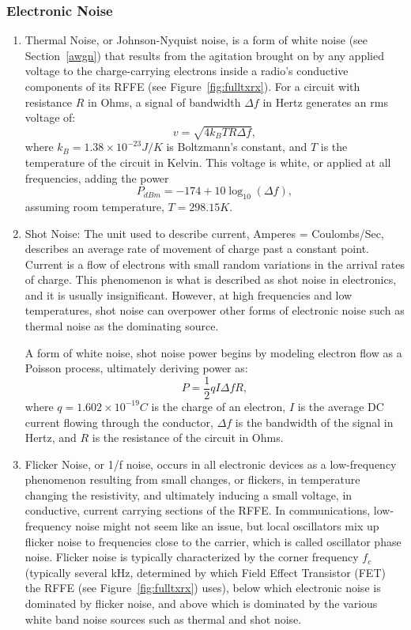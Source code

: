 \subsubsection{Electronic Noise}
\label{enoise}
\begin{enumerate}
	\item Thermal Noise, or Johnson-Nyquist noise, is a form of white noise (see Section~\ref{awgn}) that results from the agitation brought on by any applied voltage to the charge-carrying electrons inside a radio's conductive components of its RFFE (see Figure~\ref{fig:fulltxrx}). For a circuit with resistance $R$ in Ohms, a signal of bandwidth $\Delta f$ in Hertz generates an rms voltage of:
\begin{equation}
\label{eq;thermnoise}
v = \sqrt{4 k_B T R \Delta f},
\end{equation}
where $k_B=1.38 \times 10^{-23} J/K$ is Boltzmann's constant, and $T$ is the temperature of the circuit in Kelvin. This voltage is white, or applied at all frequencies, adding the power
\begin{equation}
\label{eq:thermpower}
P_{dBm} = -174 + 10 \log_{10} (\Delta f),
\end{equation}
assuming room temperature, $T=298.15 K$.
    \item Shot Noise: The unit used to describe current, Amperes = Coulombs/Sec, describes an average rate of movement of charge past a constant point. Current is a flow of electrons with small random variations in the arrival rates of charge. This phenomenon is what is described as shot noise in electronics, and it is usually insignificant. However, at high frequencies and low temperatures, shot noise can overpower other forms of electronic noise such as thermal noise as the dominating source.
    
A form of white noise, shot noise power begins by modeling electron flow as a Poisson process, ultimately deriving power as:
\begin{equation}
\label{eq:shot}
P = \frac{1}{2} qI \Delta f R,
\end{equation}
where $q=1.602\times 10^{-19} C$ is the charge of an electron, $I$ is the average DC current flowing through the conductor, $\Delta f$ is the bandwidth of the signal in Hertz, and $R$ is the resistance of the circuit in Ohms.

    \item Flicker Noise, or 1/f noise, occurs in all electronic devices as a low-frequency phenomenon resulting from small changes, or flickers, in temperature changing the resistivity, and ultimately inducing a small voltage, in conductive, current carrying sections of the RFFE. In communications, low-frequency noise might not seem like an issue, but local oscillators mix up flicker noise to frequencies close to the carrier, which is called oscillator phase noise. Flicker noise is typically characterized by the corner frequency $f_c$ (typically several kHz, determined by which Field Effect Transistor (FET) the RFFE (see Figure~\ref{fig:fulltxrx}) uses), below which electronic noise is dominated by flicker noise, and above which is dominated by the various white band noise sources such as thermal and shot noise.
    

\end{enumerate}
